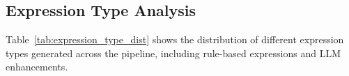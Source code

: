 \subsection{Expression Type Analysis}

Table~\ref{tab:expression_type_dist} shows the distribution of different expression types generated across the pipeline, including rule-based expressions and LLM enhancements.

\begin{table}[H]
\centering
\caption{Expression Type Distribution}
\label{tab:expression_type_dist}
\end{table}
